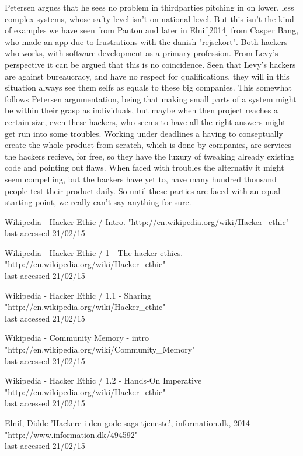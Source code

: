 \documentclass[paper=a4, fontsize=11pt]{scrartcl} %
\numberwithin{equation}{section} %
\numberwithin{figure}{section} %
\numberwithin{table}{section} %
\begin{document}
	Petersen argues that he sees no problem in thirdparties pitching in on lower, less complex systems, whose safty level isn't on national level\cite{info}. But this isn't the kind of examples we have seen from Panton and later in Elnif[2014] from Casper Bang, who made an app due to frustrations with the danish "rejsekort". Both hackers who works, with software development as a primary profession. From Levy's perspective it can be argued that this is no coincidence. Seen that Levy's hackers are against bureaucracy, and have no respect for qualifications, they will in this situation always see them selfs as equals to these big companies. This somewhat follows Petersen argumentation, being that making small parts of a system might be within their grasp as individuals, but maybe when then project reaches a certain size, even these hackers, who seems to have all the right answers might get run into some troubles. Working under deadlines a having to conseptually create the whole product from scratch, which is done by companies, are services the hackers recieve, for free, so they have the luxury of tweaking already existing code and pointing out flaws. When faced with troubles the alternativ it might seem compelling, but the hackers have yet to, have many hundred thousand people test their product daily. So until these parties are faced with an equal starting point, we really can't say anything for sure.
	

\begin{thebibliography}{9}
	
	Wikipedia - Hacker Ethic / Intro.
	"http://en.wikipedia.org/wiki/Hacker\_ethic" \\
	last accessed 21/02/15
	
	Wikipedia - Hacker Ethic / 1 - The hacker ethics.
	"http://en.wikipedia.org/wiki/Hacker\_ethic" \\
	last accessed 21/02/15
	
	Wikipedia - Hacker Ethic / 1.1 - Sharing
	"http://en.wikipedia.org/wiki/Hacker\_ethic" \\
	last accessed 21/02/15
	
	Wikipedia - Community Memory - intro
	"http://en.wikipedia.org/wiki/Community\_Memory" \\
	last accessed 21/02/15
	
	Wikipedia - Hacker Ethic / 1.2 - Hands-On Imperative
	"http://en.wikipedia.org/wiki/Hacker\_ethic" \\
	last accessed 21/02/15
	
	Elnif, Didde 'Hackere i den gode sags tjeneste', information.dk, 2014 
	"http://www.information.dk/494592" \\
	last accessed 21/02/15
	
\end{thebibliography}
\end{document}
